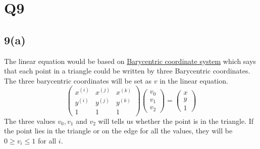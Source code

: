 \documentclass{article}
\begin{document}
\section{Q9}
\subsection*{9(a)}
The linear equation would be based on \hyperref[https://en.wikipedia.org/wiki/Barycentric_coordinate_system]{Barycentric coordinate system} which says that each point in a triangle could be written by three Barycentric coordinates. The three barycentric coordinates will be set as $v$ in the linear equation.
\begin{equation*}
\begin{pmatrix}
x^{(i)} & x^{(j)} & x^{(k)} \\
y^{(i)} & y^{(j)} & y^{(k)} \\
1 & 1 & 1 
\end{pmatrix}
\begin{pmatrix}
v_0 \\
v_1 \\
v_2 
\end{pmatrix}
=
\begin{pmatrix}
x \\
y \\
1 
\end{pmatrix}
\end{equation*}
The three values $v_0, v_1$ and $v_2$ will tells us whether the point is in the triangle. If the point lies in the triangle or on the edge for all the values, they will be $0 \geq v_i \leq 1$ for all $i$.
\end{document}
